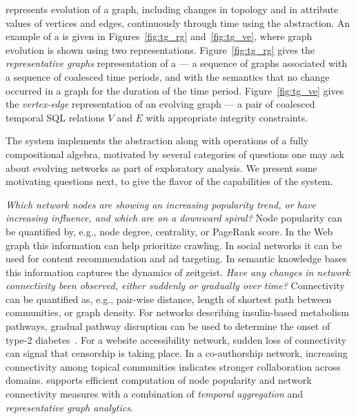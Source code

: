 \ql represents evolution of a graph, including changes in topology and
in attribute values of vertices and edges, continuously through time
using the \tg abstraction.  An example of a \tg is given in
Figures~\ref{fig:tg_rg} and~\ref{fig:tg_ve}, where graph evolution is
shown using two representations.  Figure~\ref{fig:tg_rg} gives the
{\em representative graphs} representation of a \tg --- a sequence of
graphs associated with a sequence of coalesced time periods, and with
the semantics that no change occurred in a graph for the duration of
the time period. Figure~\ref{fig:tg_ve} gives the {\em vertex-edge}
representation of an evolving graph --- a pair of coalesced temporal
SQL relations $V$ and $E$ with appropriate integrity constraints.


The \ql system implements the \tg abstraction along with operations of
a fully compositional \tg algebra, motivated by several categories of
questions one may ask about evolving networks as part of exploratory
analysis.  We present some motivating questions next, to give the
flavor of the capabilities of the \ql system.

{\em Which network nodes are showing an increasing popularity trend,
  or have increasing influence, and which are on a downward spiral?}
Node popularity can be quantified by, e.g., node degree, centrality,
or PageRank score.  In the Web graph this information can help
prioritize crawling.  In social networks it can be used for content
recommendation and ad targeting.  In semantic knowledge bases this
information captures the dynamics of zeitgeist.
%
{\em Have any changes in network connectivity been observed, either
  suddenly or gradually over time?} Connectivity can be quantified as,
e.g., pair-wise distance, length of shortest path between communities,
or graph density.  For networks describing insulin-based metabolism
pathways, gradual pathway disruption can be used to determine the
onset of type-2 diabetes~\cite{DBLP:journals/tcsb/BeyerTLSF10}.  For a
website accessibility network, sudden loss of connectivity can signal
that censorship is taking place. In a co-authorship network,
increasing connectivity among topical communities indicates stronger
collaboration across domains.
%
\ql supports efficient computation of node popularity and network
connectivity measures with a combination of {\em temporal aggregation}
and {\em representative graph analytics}.

